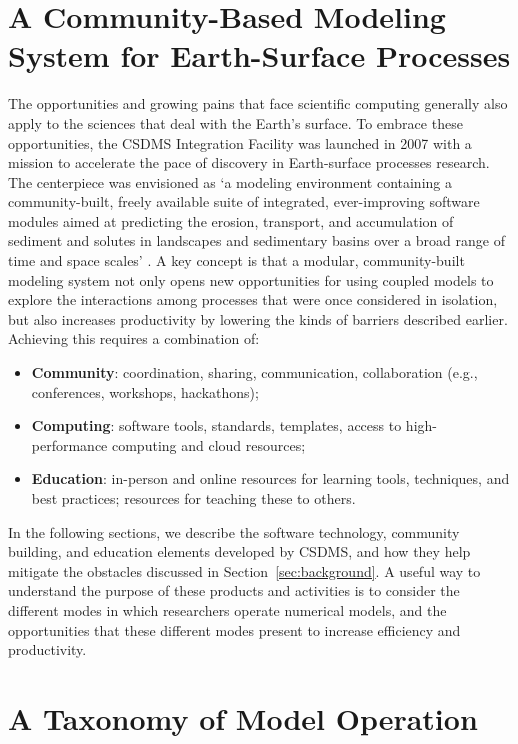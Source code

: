 \documentclass{article} %
\begin{document}
\section{A Community-Based Modeling System for Earth-Surface Processes}
\label{sec:csdms}

The opportunities and growing pains that face scientific computing generally also apply to the sciences that deal with the Earth's surface. To embrace these opportunities, the CSDMS Integration Facility was launched in 2007 with a mission to accelerate the pace of discovery in Earth-surface processes research. The centerpiece was envisioned as `a modeling environment containing a community-built, freely available suite of integrated, ever-improving software modules aimed at predicting the erosion, transport, and accumulation of sediment and solutes in landscapes and sedimentary basins over a broad range of time and space scales' \citep{anderson2004community}. A key concept is that a modular, community-built modeling system not only opens new opportunities for using coupled models to explore the interactions among processes that were once considered in isolation, 
but also increases productivity by lowering the kinds of barriers described earlier. Achieving this requires a combination of:
\begin{itemize}
\item
\textbf{Community}: coordination, sharing, communication, collaboration (e.g., conferences, workshops, hackathons);
\item
\textbf{Computing}: software tools, standards, templates, access to high-performance computing and cloud resources;
\item
\textbf{Education}: in-person and online resources for learning tools, techniques, and best practices; resources for teaching these to others.
\end{itemize}
In the following sections, we describe the software technology, community building, and education elements developed by CSDMS, and how they help mitigate the obstacles discussed in Section~\ref{sec:background}. A useful way to understand the purpose of these products and activities is to consider the different modes in which researchers operate numerical models, and the opportunities that these different modes present to increase efficiency and productivity.


\section{A Taxonomy of Model Operation}
\label{sec:taxonomy}
\end{document}
